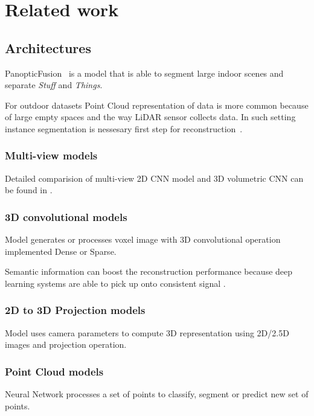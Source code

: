 \chapter{Related work}

\section{Architectures}

PanopticFusion~\cite{narita2019panopticfusion} is a model that is able to segment large indoor scenes and separate \textit{Stuff} and \textit{Things}.


For outdoor datasets Point Cloud representation of data is more common because of large empty spaces and the way LiDAR sensor collects data. In such setting instance segmentation is nessesary first step for reconstruction~\cite{zhang2020instance}.

\subsection{Multi-view models}

Detailed comparision of multi-view 2D CNN model and 3D volumetric CNN can be found in \cite{qi2016volumetric}.
\subsection{3D convolutional models}

Model generates or processes voxel image with 3D convolutional operation implemented Dense or Sparse.

Semantic information can boost the reconstruction performance because deep learning systems are able to pick up onto consistent signal \cite{jiao2018look,tatarchenko2019single,kendall2018multi}.

\subsection{2D to 3D Projection models}

Model uses camera parameters to compute 3D representation using 2D/2.5D images and projection operation.

\subsection{Point Cloud models}

Neural Network processes a set of points to classify, segment or predict new set of points.

